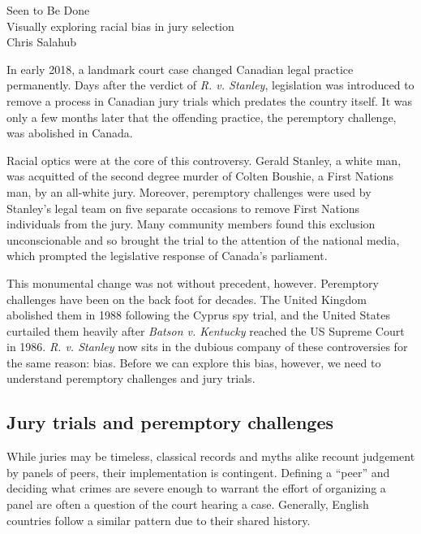 \documentclass[12pt]{article}
\let\svthefootnote\thefootnote
\begin{document}
\begin{center}
	\Large Seen to Be Done \\ {\large Visually exploring racial bias in jury selection}
	\\ \vspace{0.5cm}
	\large Chris Salahub\let\thefootnote\relax{}
	\let\thefootnote\svthefootnote
\end{center}
 

In early 2018, a landmark court case changed Canadian legal practice permanently. Days after the verdict of \emph{R. v. Stanley}, legislation was introduced to remove a process in Canadian jury trials which predates the country itself. It was only a few months later that the offending practice, the peremptory challenge, was abolished in Canada.

Racial optics were at the core of this controversy. Gerald Stanley, a white man, was acquitted of the second degree murder of Colten Boushie, a First Nations man, by an all-white jury. Moreover, peremptory challenges were used by Stanley's legal team on five separate occasions to remove First Nations individuals from the jury. Many community members found this exclusion unconscionable and so brought the trial to the attention of the national media, which prompted the legislative response of Canada's parliament.

This monumental change was not without precedent, however. Peremptory challenges have been on the back foot for decades. The United Kingdom abolished them in 1988 following the Cyprus spy trial, and the United States curtailed them heavily after \emph{Batson v. Kentucky} reached the US Supreme Court in 1986. \emph{R. v. Stanley} now sits in the dubious company of these controversies for the same reason: bias. Before we can explore this bias, however, we need to understand peremptory challenges and jury trials.

\subsection*{Jury trials and peremptory challenges}

While juries may be timeless, classical records and myths alike recount judgement by panels of peers, their implementation is contingent. Defining a ``peer'' and deciding what crimes are severe enough to warrant the effort of organizing a panel are often a question of the court hearing a case. Generally, English countries follow a similar pattern due to their shared history.
\end{document}
